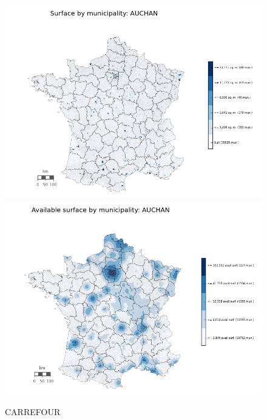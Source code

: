 \documentclass[11pt]{article}
\begin{document}
\begin{figure}[H]
    \caption{CARREFOUR}
	\centering
		\includegraphics[width=15cm]{images/maps_surface/AUCHAN.png}
        \includegraphics[width=15cm]{images/maps_available_surface/AUCHAN.png}
\end{figure}
\end{document}

